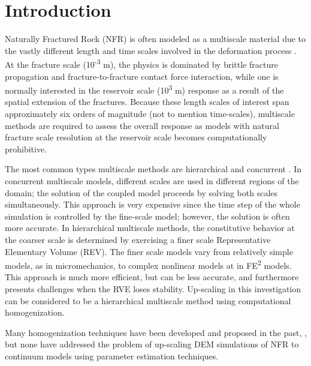 \section{Introduction}
Naturally Fractured Rock (NFR) is often modeled as a multiscale material due to the vastly different length and time scales involved in the deformation process \citep{zhou_flow_2003}. At the fracture scale (10\textsuperscript{-3} m), the physics is dominated by brittle fracture propagation and fracture-to-fracture contact force interaction, while one is normally interested in the reservoir scale (10\textsuperscript{3} m) response as a result of the spatial extension of the fractures. Because these length scales of interest span approximately six orders of magnitude (not to mention time-scales), multiscale methods are required to assess the overall response as models with natural fracture scale resolution at the reservoir scale becomes computationally prohibitive.

The most common types multiscale methods are hierarchical and concurrent \citep{Gracie_2011}. In concurrent multiscale models, different scales are used in different regions of the domain; the solution of the coupled model proceeds by solving both scales simultaneously. This approach is very expensive since the time step of the whole simulation is controlled by the fine-scale model; however, the solution is often more accurate.  In hierarchical multiscale methods, the constitutive behavior at the coarser scale is determined by exercising a finer scale Representative Elementary Volume (REV). The finer scale models vary from relatively simple models, as in micromechanics, to complex nonlinear models at in FE\textsuperscript{2} models. This approach is much more efficient, but can be less accurate, and furthermore  presents challenges when the RVE loses stability. Up-scaling in this investigation can be considered to be a hierarchical multiscale method using computational homogenization. 

Many homogenization techniques have been developed and proposed in the past, \citep{Aanonsen_2006,Temizer_2009,Loehnert_2005}, but none have addressed the problem of up-scaling DEM simulations of NFR to continuum models using parameter estimation techniques.

